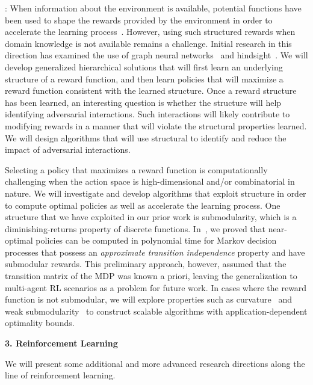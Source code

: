 \documentclass{NSF}
\begin{document}
:
When information about the environment is available, potential functions have been used to shape the rewards provided by the environment in order to accelerate the learning process~\cite{ng1999policy, devlin2011empirical, devlin2014potential, harutyunyan2015expressing}. 
However, using such structured rewards when domain knowledge is not available remains a challenge. 
Initial research in this direction has examined the use of graph neural networks~\cite{klissarov2020reward} and hindsight~\cite{mesnard2021counterfactual}. 
We will develop generalized hierarchical solutions that will first learn an underlying structure of a reward function, and then learn policies that will maximize a reward function consistent with the learned structure. 
Once a reward structure has been learned, an interesting question is whether the structure will help identifying adversarial interactions. 
Such interactions will likely contribute to modifying rewards in a manner that will violate the structural properties learned. 
We will design algorithms that will use structural to identify and reduce the impact of adversarial interactions.

Selecting a policy that maximizes a reward function is computationally challenging when the action space is high-dimensional and/or combinatorial in nature. 
We will investigate and develop algorithms that exploit structure in order to compute optimal policies as well as accelerate the learning process. 
One structure that we have exploited in our prior work is submodularity, which is a diminishing-returns property of discrete functions. 
In~\cite{sahabandu2021scalable}, we proved that near-optimal policies can be computed in polynomial time for Markov decision processes that possess an \emph{approximate transition independence} property and have submodular rewards. 
This preliminary approach, however, assumed that the transition matrix of the MDP was known a priori, leaving the generalization to multi-agent RL scenarios as a problem for future work. 
In cases where the reward function is not submodular, we will explore properties such as curvature~\cite{sviridenko2017optimal} and weak submodularity~\cite{liu2018controlled, liu2018minimal} to construct scalable algorithms with application-dependent optimality bounds.



\noindent \textbf{3. Reinforcement Learning}

We will present some additional and more advanced research directions along the line of reinforcement learning. 
\end{document}
